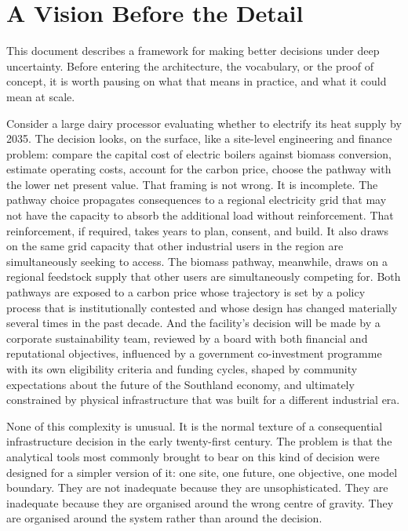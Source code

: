 \documentclass[
  11pt,
  a4paper,
  twoside,
  openright]{scrbook}
\begin{document}
\hfill\break

\section{A Vision Before the Detail}\label{a-vision-before-the-detail}

This document describes a framework for making better decisions under
deep uncertainty. Before entering the architecture, the vocabulary, or
the proof of concept, it is worth pausing on what that means in
practice, and what it could mean at scale.

Consider a large dairy processor evaluating whether to electrify its
heat supply by 2035. The decision looks, on the surface, like a
site-level engineering and finance problem: compare the capital cost of
electric boilers against biomass conversion, estimate operating costs,
account for the carbon price, choose the pathway with the lower net
present value. That framing is not wrong. It is incomplete. The pathway
choice propagates consequences to a regional electricity grid that may
not have the capacity to absorb the additional load without
reinforcement. That reinforcement, if required, takes years to plan,
consent, and build. It also draws on the same grid capacity that other
industrial users in the region are simultaneously seeking to access. The
biomass pathway, meanwhile, draws on a regional feedstock supply that
other users are simultaneously competing for. Both pathways are exposed
to a carbon price whose trajectory is set by a policy process that is
institutionally contested and whose design has changed materially
several times in the past decade. And the facility's decision will be
made by a corporate sustainability team, reviewed by a board with both
financial and reputational objectives, influenced by a government
co-investment programme with its own eligibility criteria and funding
cycles, shaped by community expectations about the future of the
Southland economy, and ultimately constrained by physical infrastructure
that was built for a different industrial era.

None of this complexity is unusual. It is the normal texture of a
consequential infrastructure decision in the early twenty-first century.
The problem is that the analytical tools most commonly brought to bear
on this kind of decision were designed for a simpler version of it: one
site, one future, one objective, one model boundary. They are not
inadequate because they are unsophisticated. They are inadequate because
they are organised around the wrong centre of gravity. They are
organised around the system rather than around the decision.
\end{document}
